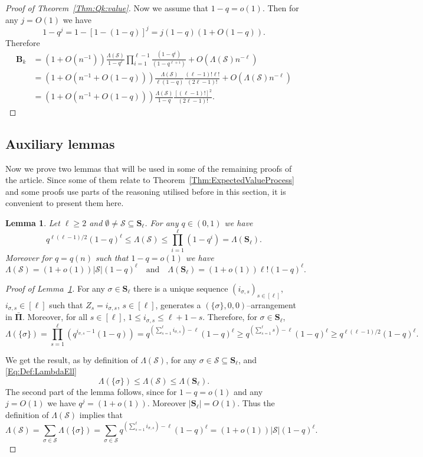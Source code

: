 \documentclass[letterpaper,11pt]{article}
\newtheorem{lemma}[theorem]{Lemma}
\theoremstyle{definition}
\theoremstyle{remark}
\renewcommand{\le}{\leqslant}
\renewcommand{\ge}{\geqslant}
\newcommand{\bS}{\mathbf{S}}
\newcommand{\product}{\Lambda}
\newcommand{\productO}{\Lambda(\cS)}
\newcommand{\bB}{\mathbf{B}}
\newcommand{\barPi}{\bar {\mathbf \Pi}}
\newcommand{\cS}{\mathcal{S}}
\begin{document}
\begin{proof}[Proof of Theorem~\ref{Thm:Qk:value}]
	Now we assume that $1-q=o(1)$. Then for any $j=O(1)$ we have
	\[
	1-q^j=1-[1-(1-q)]^j=j(1-q)(1+O(1-q)).
	\]
	Therefore
	\begin{align}\nonumber
		\bB_{k}
		&=(1+O(n^{-1}))\frac{\productO}{1-q^\ell}\prod_{i=1}^{\ell-1}\frac{(1-q^i)}{(1-q^{\ell+i})}+O(\productO n^{-\ell})\\	\nonumber		&=(1+O(n^{-1}+O(1-q)))\frac{\productO}{\ell(1-q)}\frac{(\ell-1)!\ell!}{(2\ell-1)!}+O(\productO n^{-\ell})\\
		\label{Eq:q:tendsto1}			&=(1+O(n^{-1}+O(1-q)))\frac{\productO}{1-q}\frac{[(\ell-1)!]^2}{(2\ell-1)!}.
	\end{align}
\end{proof}


\subsection{Auxiliary lemmas}

Now we prove two lemmas that will be used in some of the remaining proofs of the article. Since some of them relate to Theorem~\ref{Thm:ExpectedValueProcess} and some proofs use parts of the reasoning utilised before in this section, it is convenient to present them here. 


\begin{lemma}\label{Lem:ProductO}
	Let $\ell\ge 2$ and $\emptyset\neq\cS\subseteq \bS_\ell$. For any $q\in (0,1)$ we have 
	\[	q^{\ell(\ell-1)/2}(1-q)^\ell\le \productO\le \prod_{i=1}^{\ell}(1-q^i)=
	\product(\bS_\ell).\]
	Moreover for $q=q(n)$ such that $1-q=o(1)$ we have
	\[
	\productO = (1+o(1)) |\cS|(1-q)^{\ell}
	\quad\text{and}\quad	\product(\bS_\ell)=(1+o(1)) \ell! (1-q)^{\ell}.
	\]
\end{lemma}





\begin{proof}[Proof of Lemma~\ref{Lem:ProductO}]
	For any $\sigma\in \bS_\ell$ there is a unique sequence $(i_{\sigma,s})_{s\in [\ell]}$, $i_{\sigma,s}\in [\ell]$ such that $Z_s=i_{\sigma,s}$, $s\in [\ell]$, generates a $(\{\sigma\},0,0)$--arrangement in $\barPi$. Moreover, for all $s\in [\ell]$, $1\le i_{\sigma,s}\le \ell+1-s$. Therefore, for $\sigma\in \bS_\ell$,
	\[
	\product(\{\sigma\})=\prod_{s=1}^{\ell}\left(q^{i_{\sigma,s}-1}(1-q)\right)
	=q^{(\sum_{s=1}^{\ell}i_{\sigma,s})-\ell}(1-q)^\ell\ge q^{(\sum_{s=1}^{\ell}s) - \ell}(1-q)^\ell\ge q^{\ell(\ell-1)/2}(1-q)^\ell.
	\]	
	
	We get the result, as by definition of $\productO$, for any $\sigma\in \cS\subseteq \bS_\ell$, and \eqref{Eq:Def:LambdaEll}
	\[
	\product(\{\sigma\})\le \productO\le \product(\bS_\ell).
	\] 
	The second part of the lemma follows, since for $1-q=o(1)$ and any $j=O(1)$ we have
	$
	q^{j}=(1+o(1)).
	$ 
	Moreover $|\bS_\ell|=O(1)$. Thus the definition of $\productO$ implies that
	\[
	\productO=\sum_{\sigma\in \cS}\product(\{\sigma\})=\sum_{\sigma\in \cS}q^{(\sum_{s=1}^{\ell}i_{\sigma,s})-\ell}(1-q)^\ell=(1+o(1))|\cS| (1-q)^\ell.
	\]
\end{proof}
\end{document}
